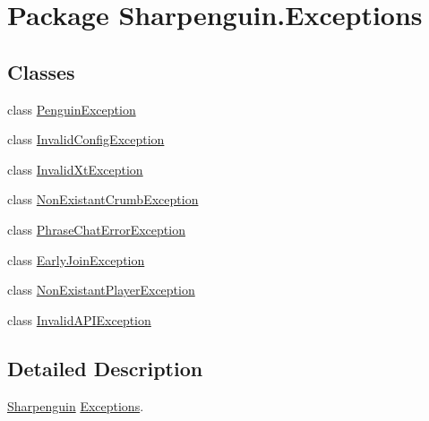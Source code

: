 \hypertarget{namespaceSharpenguin_1_1Exceptions}{\section{\-Package \-Sharpenguin.\-Exceptions}
\label{namespaceSharpenguin_1_1Exceptions}
}
\subsection*{\-Classes}
\begin{DoxyCompactItemize}
\item 
class \hyperlink{classSharpenguin_1_1Exceptions_1_1PenguinException}{\-Penguin\-Exception}
\item 
class \hyperlink{classSharpenguin_1_1Exceptions_1_1InvalidConfigException}{\-Invalid\-Config\-Exception}
\item 
class \hyperlink{classSharpenguin_1_1Exceptions_1_1InvalidXtException}{\-Invalid\-Xt\-Exception}
\item 
class \hyperlink{classSharpenguin_1_1Exceptions_1_1NonExistantCrumbException}{\-Non\-Existant\-Crumb\-Exception}
\item 
class \hyperlink{classSharpenguin_1_1Exceptions_1_1PhraseChatErrorException}{\-Phrase\-Chat\-Error\-Exception}
\item 
class \hyperlink{classSharpenguin_1_1Exceptions_1_1EarlyJoinException}{\-Early\-Join\-Exception}
\item 
class \hyperlink{classSharpenguin_1_1Exceptions_1_1NonExistantPlayerException}{\-Non\-Existant\-Player\-Exception}
\item 
class \hyperlink{classSharpenguin_1_1Exceptions_1_1InvalidAPIException}{\-Invalid\-A\-P\-I\-Exception}
\end{DoxyCompactItemize}


\subsection{\-Detailed \-Description}
\hyperlink{namespaceSharpenguin}{\-Sharpenguin} \hyperlink{namespaceSharpenguin_1_1Exceptions}{\-Exceptions}. 